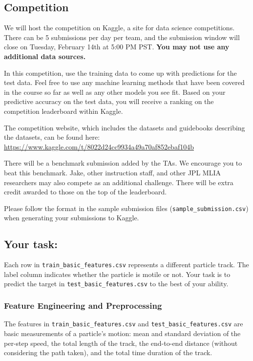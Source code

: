 \subsection{Competition}

We will host the competition on Kaggle, a site for data science competitions. There can be 5 submissions per day per team, and the submission window will close on Tuesday, February 14th at 5:00 PM PST. \textbf{You may not use any additional data sources.}

In this competition, use the training data to come up with predictions for the test data. Feel free to use any machine learning methods that have been covered in the course so far as well as any other models you see fit. Based on your predictive accuracy on the test data, you will receive a ranking on the competition leaderboard within Kaggle.

The competition website, which includes the datasets and guidebooks describing the datasets, can be found here:
\url{https://www.kaggle.com/t/8022d24cc9934a49a70af852ebaf104b}

There will be a benchmark submission added by the TAs. We encourage you to beat this benchmark. Jake, other instruction staff, and other JPL MLIA researchers may also compete as an additional challenge. There will be extra credit awarded to those on the top of the leaderboard.

Please follow the format in the sample submission files (\texttt{sample_submission.csv}) when generating your submissions to Kaggle.

\subsection{Your task:}

Each row in \texttt{train_basic_features.csv} represents a different particle track. The label column indicates whether the particle is motile or not. Your task is to predict the target in \texttt{test_basic_features.csv} to the best of your ability.

\subsubsection{Feature Engineering and Preprocessing}

The features in \texttt{train_basic_features.csv} and \texttt{test_basic_features.csv} are basic measurements of a particle's motion: mean and standard deviation of the per-step speed, the total length of the track, the end-to-end distance (without considering the path taken), and the total time duration of the track.

